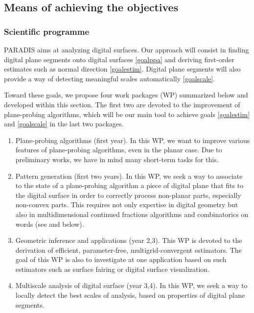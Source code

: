 \subsection{Means of achieving the objectives}


\subsubsection{Scientific programme}
\label{sec:wp}


PARADIS aims at analyzing digital surfaces. Our approach will consist in finding
digital plane segments onto digital surfaces \ref{goalppa} and deriving first-order
estimates such as normal direction \ref{goalestim}. Digital plane segments will
also provide a way of detecting meaningful scales automatically \ref{goalscale}.

Toward these goals, we propose four work packages (WP) summarized below and
developed within this section. The first two are devoted to the improvement of
plane-probing algorithms, which will be our main tool to achieve goals \ref{goalestim}
and \ref{goalscale} in the last two packages. 

\begin{enumerate} [label=(W\arabic*),start=0]
\item Plane-probing algorithms (first year). In this WP, we want to
  improve various features of plane-probing algorithms, even in the
  planar case. Due to preliminary works, we have in mind many short-term tasks for this.  \label{wp0}
\item Pattern generation (first two years). In this WP, we seek a way to associate
  to the state of a plane-probing algorithm a piece of digital plane
  that fits to the digital surface in order to correctly process non-planar parts,
  especially non-convex parts. This requires not only expertise in
  digital geometry but also in multidimensional continued fractions
  algorithms and combinatorics on words (see  and below).  \label{wp1} 
\item Geometric inference and applications (year 2,3). This WP is devoted
  to the derivation of efficient, parameter-free, multigrid-convergent estimators.
  The goal of this WP is also to investigate at one application based on such
  estimators such as surface fairing or digital surface visualization. \label{wp2} 
\item Multiscale analysis of digital surface (year 3,4). In this WP, we
  seek a way to locally detect the best scales of analysis, based on properties
  of digital plane segments. \label{wp3}
\end{enumerate}

